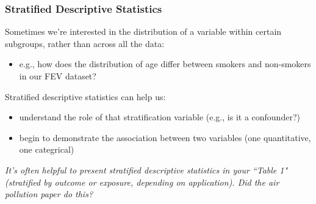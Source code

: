 \documentclass[12pt, 
hyperref={colorlinks=true, linkcolor=blue, urlcolor=cyan}]{beamer}
\begin{document}
\begin{frame}
\frametitle{Stratified Descriptive Statistics} %

Sometimes we're interested in the distribution of a variable within certain subgroups, rather than across all the data: \vspace{-0.3cm}
\begin{itemize}
\item e.g., how does the distribution of age differ between smokers and non-smokers in our FEV dataset? %
\end{itemize}

Stratified descriptive statistics can help us:\vspace{-0.3cm}
\begin{itemize}
\item understand the role of that  stratification variable (e.g., is it a confounder?)
\item begin to demonstrate the association between two variables (one quantitative, one categrical)
\end{itemize}

\begin{footnotesize} \textit{It's often helpful to present stratified descriptive statistics in your ``Table 1" (stratified by outcome or exposure, depending on application). Did the air pollution paper do this?} \end{footnotesize}

\end{frame}
\end{document}
